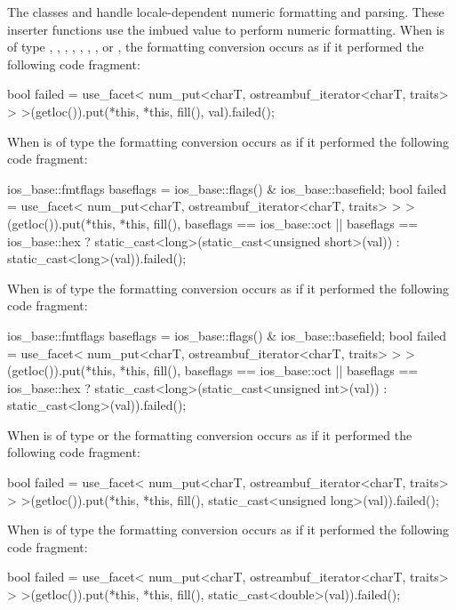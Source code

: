 \begin{itemdescr}
\pnum
\effects
The classes
and
handle locale-dependent numeric formatting and
parsing.
These inserter functions use the imbued
value to perform numeric formatting.
When 
is of type
,
,
,
, ,
,
,
or
,
the formatting conversion occurs as if it performed the following code fragment:
\begin{codeblock}
bool failed = use_facet<
  num_put<charT, ostreambuf_iterator<charT, traits> >
    >(getloc()).put(*this, *this, fill(), val).failed();
\end{codeblock}

When  is of type
the formatting conversion occurs as if it performed the following code fragment:
\begin{codeblock}
ios_base::fmtflags baseflags = ios_base::flags() & ios_base::basefield;
bool failed = use_facet<
  num_put<charT, ostreambuf_iterator<charT, traits> >
    >(getloc()).put(*this, *this, fill(),
    baseflags == ios_base::oct || baseflags == ios_base::hex
      ? static_cast<long>(static_cast<unsigned short>(val))
      : static_cast<long>(val)).failed();
\end{codeblock}

When  is of type
the formatting conversion occurs as if it performed the following code fragment:
\begin{codeblock}
ios_base::fmtflags baseflags = ios_base::flags() & ios_base::basefield;
bool failed = use_facet<
  num_put<charT, ostreambuf_iterator<charT, traits> >
    >(getloc()).put(*this, *this, fill(),
    baseflags == ios_base::oct || baseflags == ios_base::hex
      ? static_cast<long>(static_cast<unsigned int>(val))
      : static_cast<long>(val)).failed();
\end{codeblock}

When  is of type
or
the formatting conversion occurs as if it performed the following code fragment:
\begin{codeblock}
bool failed = use_facet<
  num_put<charT, ostreambuf_iterator<charT, traits> >
    >(getloc()).put(*this, *this, fill(),
      static_cast<unsigned long>(val)).failed();
\end{codeblock}

When  is of type
the formatting conversion occurs as if it performed the following code fragment:
\begin{codeblock}
bool failed = use_facet<
  num_put<charT, ostreambuf_iterator<charT, traits> >
    >(getloc()).put(*this, *this, fill(),
      static_cast<double>(val)).failed();
\end{codeblock}


\end{itemdescr}
